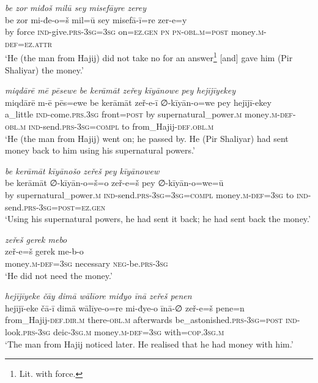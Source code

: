 \ea \label{ŽP.107}
\textit{be zor miđoš milū sey misefāyre zerey} \\ 
\gll be zor mi-đe-o=š mil=ū sey misefā-ī=re zer-e=y \\ 
 by force \textsc{ind-}give\textsc{.prs}\textsc{-3sg}\textsc{=3sg} on\textsc{\textsc{=ez.gen}} \textsc{pn} \textsc{pn}\textsc{-obl}\textsc{.m}\textsc{=\textsc{post}} money\textsc{.m}\textsc{-def}\textsc{=ez}.\textsc{attr} \\ 
\glt `He (the man from Hajij) did not take no for an answer\footnote{Lit. with force.} [and] gave him (Pir Shaliyar) the money.'
\z 
 
\ea \label{ŽP.109}
\textit{miqdārē mē pēsewe be kerāmāt zeřey kīyānowe pey hejījīyekey} \\ 
\gll miqdārē m-ē pēs=ewe be kerāmāt zeř-e-ī ∅-kīyān-o=we pey hejījī-ekey \\ 
 a\_little \textsc{ind-}come\textsc{.prs}\textsc{.3sg} front\textsc{=\textsc{post}} by supernatural\_power\textsc{.m} money\textsc{.m}\textsc{-def}\textsc{-obl}\textsc{.m} \textsc{ind-}send\textsc{.prs}\textsc{-3sg}\textsc{=compl} to from\_Hajij\textsc{-def}\textsc{.obl}\textsc{.m} \\ 
\glt `He (the man from Hajij) went on; he passed by. He (Pir Shaliyar) had sent money back to him using his supernatural powers.'
\z 
 
\ea \label{ŽP.110}
\textit{be kerāmāt kīyānošo zeřeš pey kīyānowew} \\ 
\gll be kerāmāt ∅-kīyān-o=š=o zeř-e=š pey ∅-kīyān-o=we=ū \\ 
 by supernatural\_power\textsc{.m} \textsc{ind-}send\textsc{.prs}\textsc{-3sg}\textsc{=3sg}\textsc{=compl} money\textsc{.m}\textsc{-def}\textsc{=3sg} to \textsc{ind-}send\textsc{.prs}\textsc{-3sg}\textsc{=\textsc{post}}\textsc{\textsc{=ez.gen}} \\ 
\glt `Using his supernatural powers, he had sent it back; he had sent back the money.'
\z 
 
\ea \label{ŽP.111}
\textit{zeřeš gerek mebo} \\ 
\gll zeř-e=š gerek me-b-o \\ 
 money\textsc{.m}\textsc{-def}\textsc{=3sg} necessary \textsc{neg-}be\textsc{.prs}\textsc{-3sg} \\ 
\glt `He did not need the money.'
\z 
 
\ea \label{ŽP.112}
\textit{hejījīyeke čāy dimā wālīore miđyo īnā zeřeš penen} \\ 
\gll hejījī-eke čā-ī dimā wālīye-o=re mi-đye-o īnā-∅ zeř-e=š pene=n \\ 
 from\_Hajij\textsc{-def}\textsc{.dir}\textsc{.m} there\textsc{-obl}\textsc{.m} afterwards be\_astonished\textsc{.prs}\textsc{-3sg}\textsc{=\textsc{post}} \textsc{ind-}look\textsc{.prs}\textsc{-3sg} deic\textsc{-3sg}\textsc{.m} money\textsc{.m}\textsc{-def}\textsc{=3sg} with\textsc{=cop}\textsc{.3sg}\textsc{.m} \\ 
\glt `The man from Hajij noticed later. He realised that he had money with him.'
\z 
 
